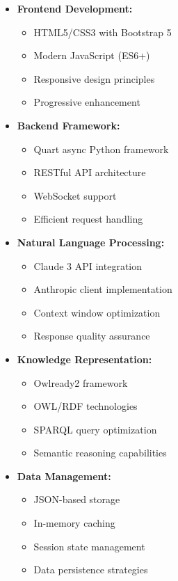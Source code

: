 \begin{itemize}
    \item \textbf{Frontend Development:}
        \begin{itemize}
            \item HTML5/CSS3 with Bootstrap 5
            \item Modern JavaScript (ES6+)
            \item Responsive design principles
            \item Progressive enhancement
        \end{itemize}
    
    \item \textbf{Backend Framework:}
        \begin{itemize}
            \item Quart async Python framework
            \item RESTful API architecture
            \item WebSocket support
            \item Efficient request handling
        \end{itemize}
    
    \item \textbf{Natural Language Processing:}
        \begin{itemize}
            \item Claude 3 API integration
            \item Anthropic client implementation
            \item Context window optimization
            \item Response quality assurance
        \end{itemize}
    
    \item \textbf{Knowledge Representation:}
        \begin{itemize}
            \item Owlready2 framework
            \item OWL/RDF technologies
            \item SPARQL query optimization
            \item Semantic reasoning capabilities
        \end{itemize}
    
    \item \textbf{Data Management:}
        \begin{itemize}
            \item JSON-based storage
            \item In-memory caching
            \item Session state management
            \item Data persistence strategies
        \end{itemize}
\end{itemize}

